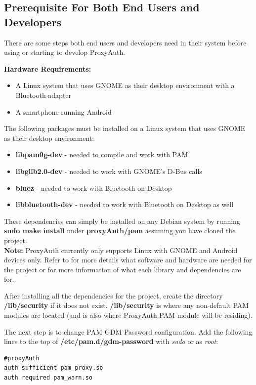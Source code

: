 \documentclass[letterpaper,twocolumn,10pt]{article}
\begin{document}
\subsection{Prerequisite For Both End Users and Developers}
There are some steps both end users and developers need in their system before using or starting to develop ProxyAuth. 

\textbf{Hardware Requirements:}
\begin{itemize}[noitemsep]
\item A Linux system that uses GNOME as their desktop environment with a Bluetooth adapter
\item A smartphone running Android
\end{itemize}


The following packages must be installed on a Linux system that uses GNOME as their desktop environment:

\begin{itemize}[noitemsep]
\item \textbf{libpam0g-dev} - needed to compile and work with PAM
\item \textbf{libglib2.0-dev} - needed to work with GNOME's D-Bus calls
\item \textbf{bluez} - needed to work with Bluetooth on Desktop
\item \textbf{libbluetooth-dev} - needed to work with Bluetooth on Desktop as well
\end{itemize}
These dependencies can simply be installed on any Debian system by running \textbf{sudo make install} under \textbf{proxyAuth/pam} assuming you have cloned the project.\\
\textbf{Note:} ProxyAuth currently only supports Linux with GNOME and Android devices only. Refer to  for more details what software and hardware are needed for the project or for more information of what each library and dependencies are for.

After installing all the dependencies for the project, create the directory \textbf{/lib/security} if it does not exist. \textbf{/lib/security} is where any non-default PAM modules are located (and is also where ProxyAuth PAM module will be residing).

The next step is to change PAM GDM Password configuration. Add the following lines to the top of \textbf{/etc/pam.d/gdm-password} with \emph{sudo} or as \emph{root}:
{\small
\begin{verbatim}
#proxyAuth
auth sufficient pam_proxy.so
auth required pam_warn.so
\end{verbatim}
}
\end{document}
